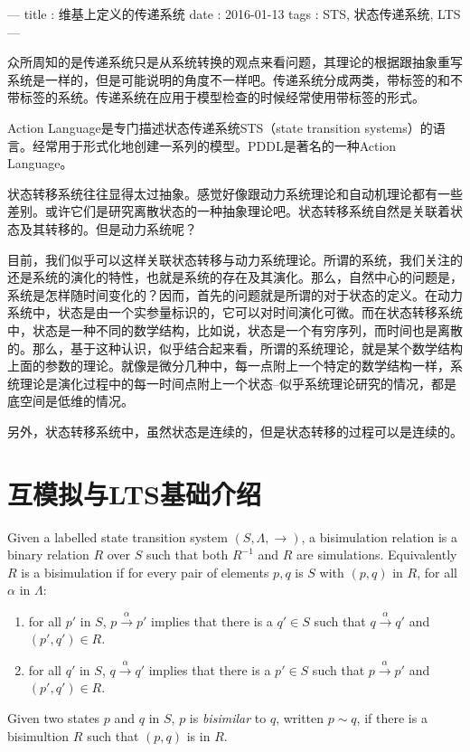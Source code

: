 ---
title : 维基上定义的传递系统
date : 2016-01-13
tags : STS, 状态传递系统, LTS
---

众所周知的是传递系统只是从系统转换的观点来看问题，其理论的根据跟抽象重写系统是一样的，但是可能说明的角度不一样吧。传递系统分成两类，带标签的和不带标签的系统。传递系统在应用于模型检查的时候经常使用带标签的形式。

Action Language是专门描述状态传递系统STS（state transition systems）的语言。经常用于形式化地创建一系列的模型。PDDL是著名的一种Action Language。

状态转移系统往往显得太过抽象。感觉好像跟动力系统理论和自动机理论都有一些差别。或许它们是研究离散状态的一种抽象理论吧。状态转移系统自然是关联着状态及其转移的。但是动力系统呢？

目前，我们似乎可以这样关联状态转移与动力系统理论。所谓的系统，我们关注的还是系统的演化的特性，也就是系统的存在及其演化。那么，自然中心的问题是，系统是怎样随时间变化的？因而，首先的问题就是所谓的对于状态的定义。在动力系统中，状态是由一个实参量标识的，它可以对时间演化可微。而在状态转移系统中，状态是一种不同的数学结构，比如说，状态是一个有穷序列，而时间也是离散的。那么，基于这种认识，似乎结合起来看，所谓的系统理论，就是某个数学结构上面的参数的理论。就像是微分几种中，每一点附上一个特定的数学结构一样，系统理论是演化过程中的每一时间点附上一个状态--似乎系统理论研究的情况，都是底空间是低维的情况。

另外，状态转移系统中，虽然状态是连续的，但是状态转移的过程可以是连续的。

\section{互模拟与LTS基础介绍}

\begin{definition}[Bisimulation]
Given a labelled state transition system $(S,\Lambda, \to)$, a bisimulation relation is a binary relation $R$ over $S$ such that both $R^{-1}$ and $R$ are simulations. Equivalently $R$ is a bisimulation if for every pair of elements $p,q$ is $S$ with $(p,q)$ in $R$, for all $\alpha$ in $\Lambda$:
\begin{enumerate}
\item for all $p'$ in $S$, $p\overset{\alpha}{\rightarrow} p'$ implies that there is a $q' \in S$ such that $q \overset{\alpha}{\rightarrow} q'$ and $(p', q')\in R$.
\item for all $q'$ in $S$, $q\overset{\alpha}{\rightarrow} q'$ implies that there is a $p' \in S$ such that $p \overset{\alpha}{\rightarrow} p'$ and $(p', q')\in R$.
\end{enumerate}
\end{definition}
Given two states $p$ and $q$ in $S$, $p$ is \emph{bisimilar} to $q$, written $p \sim q$,  if there is a bisimultion $R$ such that $(p,q)$ is in $R$.

